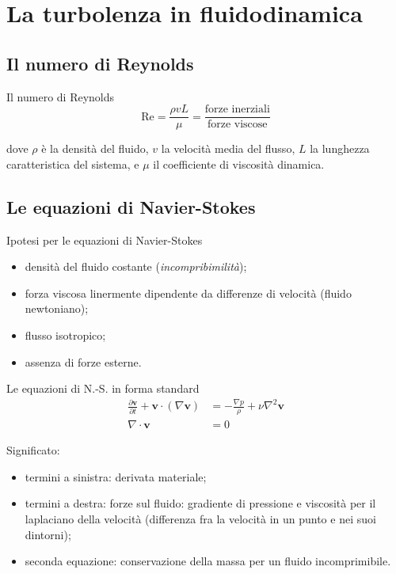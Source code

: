 \documentclass[11pt]{beamer}
\begin{document}
\section{La turbolenza in fluidodinamica}

\subsection{Il numero di Reynolds}

\begin{frame}{Il numero di Reynolds}
\begin{equation}
\text{Re} = \frac{\rho v L}{\mu} = \frac{\text{forze inerziali}}{\text{forze viscose}}
\end{equation}

dove $\rho$ è la densità del fluido, $v$ la velocità media del flusso, $L$ la lunghezza caratteristica del sistema, e $\mu$ il coefficiente di viscosità dinamica.
\end{frame}

\subsection{Le equazioni di Navier-Stokes}

\begin{frame}{Ipotesi per le equazioni di Navier-Stokes}
\begin{itemize}
\item densità del fluido costante (\emph{incompribimilità});
\item forza viscosa linermente dipendente da differenze di velocità (fluido newtoniano);
\item flusso isotropico;
\item assenza di forze esterne.
\end{itemize}
\end{frame}

\begin{frame}{Le equazioni di N.-S. in forma standard}
\begin{subequations}
\begin{align}
\frac{\partial \mathbf{v}}{\partial t} + \mathbf{v} \cdot (\nabla \mathbf{v})  &= -\frac{\nabla p}{\rho} + \nu \nabla^2 \mathbf{v} \label{navier-stokes} \\
\nabla \cdot \mathbf{v} &= 0
\end{align}
\end{subequations}

Significato:

\begin{itemize}
\item termini a sinistra: derivata materiale;
\item termini a destra: forze sul fluido: gradiente di pressione e viscosità per il laplaciano della velocità (differenza fra la velocità in un punto e nei suoi dintorni);
\item seconda equazione: conservazione della massa per un fluido incomprimibile.
\end{itemize}
\end{frame}
\end{document}
